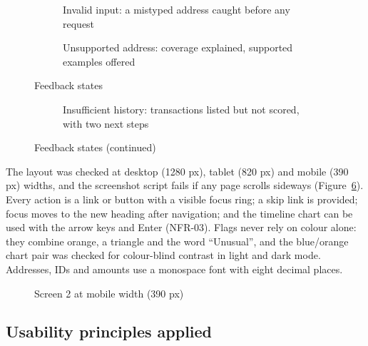 \begin{figure}[htbp]
  \centering
  \begin{subfigure}{\textwidth}
    \centering
    \caption{Invalid input: a mistyped address caught before any request}
    \label{fig:invalid}
  \end{subfigure}

  \vspace{1em}
  \begin{subfigure}{\textwidth}
    \centering
    \caption{Unsupported address: coverage explained, supported examples offered}
    \label{fig:unsupported}
  \end{subfigure}
  \caption{Feedback states}
  \label{fig:states}
\end{figure}

\begin{figure}[htbp]
  \ContinuedFloat
  \centering
  \begin{subfigure}{\textwidth}
    \centering
    \caption{Insufficient history: transactions listed but not scored, with two next steps}
    \label{fig:insufficient}
  \end{subfigure}
  \caption[]{Feedback states (continued)}
\end{figure}

The layout was checked at desktop (1280 px), tablet (820 px) and mobile (390 px) widths, and the screenshot script fails if any page scrolls sideways (Figure~\ref{fig:mobile}). Every action is a link or button with a visible focus ring; a skip link is provided; focus moves to the new heading after navigation; and the timeline chart can be used with the arrow keys and Enter (NFR-03). Flags never rely on colour alone: they combine orange, a triangle and the word “Unusual”, and the blue/orange chart pair was checked for colour-blind contrast in light and dark mode. Addresses, IDs and amounts use a monospace font with eight decimal places.

\begin{figure}[htbp]
  \centering
  \caption{Screen 2 at mobile width (390 px)}
  \label{fig:mobile}
\end{figure}

\subsection{Usability principles applied}
\label{sec:heuristics}

